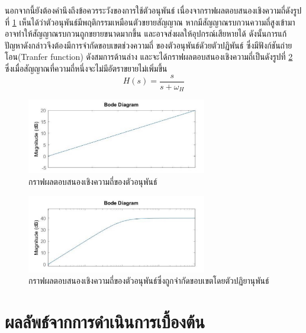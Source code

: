 \documentclass[11pt,a4paper]{article}
\begin{document}
นอกจากนี้ยังต้องคำนึงถึงข้อควรระวังของการใช้ตัวอนุพันธ์ เนื่องจากราฟผลตอบสนองเชิงความถี่ดังรูปที่ \ref{bode_1} เห็นได้ว่าตัวอนุพันธ์มีพฤติกรรมเหมือนตัวขยายสัญญาณ
หากมีสัญญาณรบกวนความถี่สูงเข้ามา อาจทำให้สัญญาณรบกวนถูกขยายขนาดมากขึ้น และอาจส่งผลให้อุปกรณ์เสียหายได้ ดังนั้นการแก้ปัญหาดังกล่าวจึงต้องมีการจำกัดขอบเขตช่วงความถี่
ของตัวอนุพันธ์ดัวยตัวปฏิพันธ์ ซึ่งมีฟังก์ชันถ่ายโอน(Tranfer function) ดังสมการด้านล่าง และจะได้กราฟผลตอบสนองเชิงความถี่เป็นดังรูปที่ \ref{bode_2} ซึ่งเมื่อสัญญาณที่ความถี่หนึ่งจะไม่มีอัตราขยายไม่เพิ่มขึ้น
\begin{equation}\label{bode1}
    H(s)  = \frac{ s }{ s + \omega_{H}  }
\end{equation}
\begin{figure}[h!]
    \begin{center}
        \includegraphics[width=0.7\textwidth]{bode_1.jpg}
    \end{center}
    \caption{กราฟผลตอบสนองเชิงความถี่ของตัวอนุพันธ์}
    \label{bode_1}
\end{figure}
\begin{figure}[h!]
    \begin{center}
        \includegraphics[width=0.7\textwidth]{bode_2.jpg}
    \end{center}
    \caption{กราฟผลตอบสนองเชิงความถี่ของตัวอนุพันธ์ซึ่งถูกจำกัดขอบเขตโดยตัวปฏิยานุพันธ์}
    \label{bode_2}
\end{figure}








\newpage

\section{ผลลัพธ์จากการดำเนินการเบื้องต้น}
\end{document}
